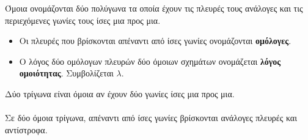 \documentclass[twoside,nofonts,internet,shmeiwseis]{thewria}
\begin{document}
\orismoi
{}
Όμοια ονομάζονται δύο πολύγωνα τα οποία έχουν τις πλευρές τους ανάλογες και τις περιεχόμενες γωνίες τους ίσες μια προς μια.
\begin{itemize}[itemsep=0mm]
\item Οι πλευρές που βρίσκονται απέναντι από ίσες γωνίες ονομάζονται \textbf{ομόλογες}.
\item Ο λόγος δύο ομόλογων πλευρών δύο όμοιων σχημάτων ονομάζεται \textbf{λόγος ομοιότητας}. Συμβολίζεται $ \lambda $.
\end{itemize}
\thewrhmata
{}
Δύο τρίγωνα είναι όμοια αν έχουν δύο γωνίες ίσες μια προς μια.\\\\
Σε δύο όμοια τρίγωνα, απέναντι από ίσες γωνίες βρίσκονται ανάλογες πλευρές και αντίστροφα.
\end{document}
